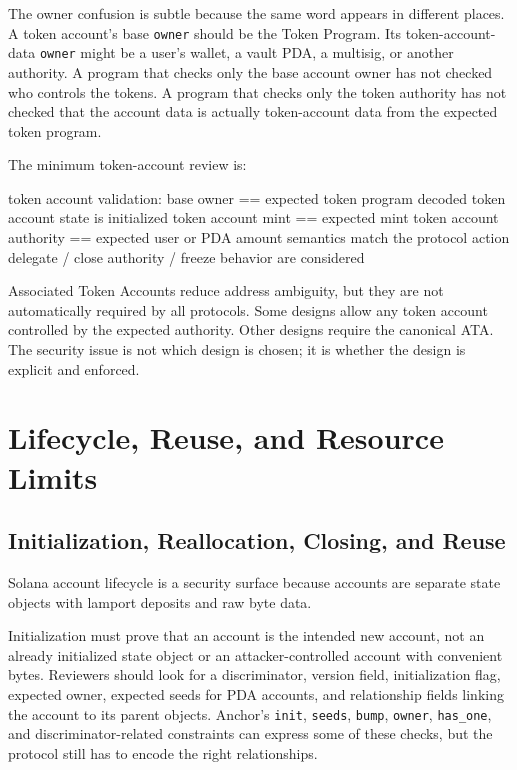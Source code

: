 The owner confusion is subtle because the same word appears in different places. A token account's base \texttt{owner} should be the Token Program. Its token-account-data \texttt{owner} might be a user's wallet, a vault PDA, a multisig, or another authority. A program that checks only the base account owner has not checked who controls the tokens. A program that checks only the token authority has not checked that the account data is actually token-account data from the expected token program.

The minimum token-account review is:

\begin{codeblock}
token account validation:
    base owner == expected token program
    decoded token account state is initialized
    token account mint == expected mint
    token account authority == expected user or PDA
    amount semantics match the protocol action
    delegate / close authority / freeze behavior are considered
\end{codeblock}

Associated Token Accounts reduce address ambiguity, but they are not automatically required by all protocols. Some designs allow any token account controlled by the expected authority. Other designs require the canonical ATA. The security issue is not which design is chosen; it is whether the design is explicit and enforced.

\section{Lifecycle, Reuse, and Resource Limits}

\subsection{Initialization, Reallocation, Closing, and Reuse}

Solana account lifecycle is a security surface because accounts are separate state objects with lamport deposits and raw byte data.

Initialization must prove that an account is the intended new account, not an already initialized state object or an attacker-controlled account with convenient bytes. Reviewers should look for a discriminator, version field, initialization flag, expected owner, expected seeds for PDA accounts, and relationship fields linking the account to its parent objects. Anchor's \texttt{init}, \texttt{seeds}, \texttt{bump}, \texttt{owner}, \texttt{has\_one}, and discriminator-related constraints can express some of these checks, but the protocol still has to encode the right relationships.

